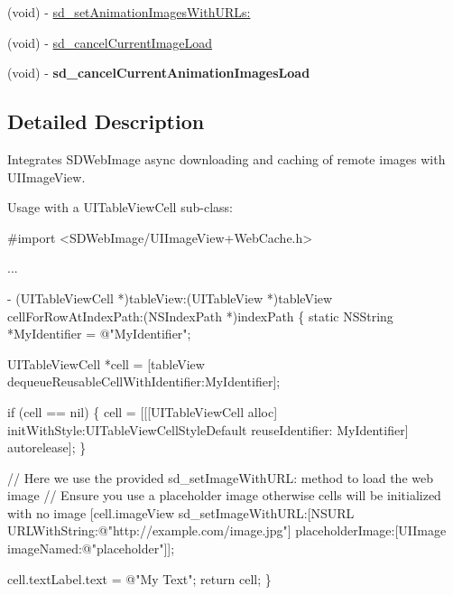 \begin{DoxyCompactItemize}
\item 
(void) -\/ \hyperlink{category_u_i_image_view_07_web_cache_08_a3d9c6bf83abb348e4130429f2087b8af}{sd\+\_\+set\+Animation\+Images\+With\+U\+R\+Ls\+:}
\item 
(void) -\/ \hyperlink{category_u_i_image_view_07_web_cache_08_a5ff7ec2145bd69460982ea6bd3b6026e}{sd\+\_\+cancel\+Current\+Image\+Load}
\item 
\hypertarget{category_u_i_image_view_07_web_cache_08_a3342e1c1ee44e86559b07b39fafebac1}{}(void) -\/ {\bfseries sd\+\_\+cancel\+Current\+Animation\+Images\+Load}\label{category_u_i_image_view_07_web_cache_08_a3342e1c1ee44e86559b07b39fafebac1}

\end{DoxyCompactItemize}


\subsection{Detailed Description}
Integrates S\+D\+Web\+Image async downloading and caching of remote images with U\+I\+Image\+View.

Usage with a U\+I\+Table\+View\+Cell sub-\/class\+:


\begin{DoxyCode}
\textcolor{preprocessor}{#import <SDWebImage/UIImageView+WebCache.h>}

...

- (UITableViewCell *)tableView:(UITableView *)tableView cellForRowAtIndexPath:(NSIndexPath *)indexPath
\{
    \textcolor{keyword}{static} NSString *MyIdentifier = \textcolor{stringliteral}{@"MyIdentifier"};
 
    UITableViewCell *cell = [tableView dequeueReusableCellWithIdentifier:MyIdentifier];
 
    \textcolor{keywordflow}{if} (cell == nil) \{
        cell = [[[UITableViewCell alloc] initWithStyle:UITableViewCellStyleDefault reuseIdentifier:
      MyIdentifier]
                 autorelease];
    \}
 
    \textcolor{comment}{// Here we use the provided sd\_setImageWithURL: method to load the web image}
    \textcolor{comment}{// Ensure you use a placeholder image otherwise cells will be initialized with no image}
    [cell.imageView sd\_setImageWithURL:[NSURL URLWithString:\textcolor{stringliteral}{@"http://example.com/image.jpg"}]
                      placeholderImage:[UIImage imageNamed:\textcolor{stringliteral}{@"placeholder"}]];
 
    cell.textLabel.text = \textcolor{stringliteral}{@"My Text"};
    \textcolor{keywordflow}{return} cell;
\}
\end{DoxyCode}
 

